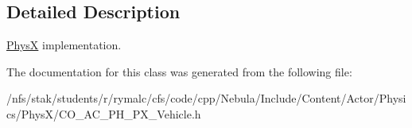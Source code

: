 \subsection{Detailed Description}
\hyperlink{namespaceContent_1_1Actor_1_1Physics_1_1PhysX}{PhysX} implementation. 

The documentation for this class was generated from the following file:\begin{DoxyCompactItemize}
\item 
/nfs/stak/students/r/rymalc/cfs/code/cpp/Nebula/Include/Content/Actor/Physics/PhysX/CO\_\-AC\_\-PH\_\-PX\_\-Vehicle.h\end{DoxyCompactItemize}
